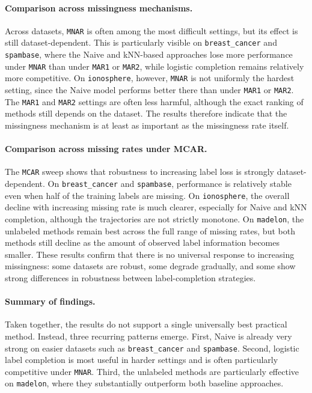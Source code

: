 \documentclass[8pt,a4paper]{extarticle}
\begin{document}
\paragraph{Comparison across missingness mechanisms.}
Across datasets, \texttt{MNAR} is often among the most difficult settings, but its effect is still dataset-dependent. This is particularly visible on \texttt{breast\_cancer} and \texttt{spambase}, where the Naive and kNN-based approaches lose more performance under \texttt{MNAR} than under \texttt{MAR1} or \texttt{MAR2}, while logistic completion remains relatively more competitive. On \texttt{ionosphere}, however, \texttt{MNAR} is not uniformly the hardest setting, since the Naive model performs better there than under \texttt{MAR1} or \texttt{MAR2}. The \texttt{MAR1} and \texttt{MAR2} settings are often less harmful, although the exact ranking of methods still depends on the dataset. The results therefore indicate that the missingness mechanism is at least as important as the missingness rate itself.

\paragraph{Comparison across missing rates under MCAR.}
The \texttt{MCAR} sweep shows that robustness to increasing label loss is strongly dataset-dependent. On \texttt{breast\_cancer} and \texttt{spambase}, performance is relatively stable even when half of the training labels are missing. On \texttt{ionosphere}, the overall decline with increasing missing rate is much clearer, especially for Naive and kNN completion, although the trajectories are not strictly monotone. On \texttt{madelon}, the unlabeled methods remain best across the full range of missing rates, but both methods still decline as the amount of observed label information becomes smaller. These results confirm that there is no universal response to increasing missingness: some datasets are robust, some degrade gradually, and some show strong differences in robustness between label-completion strategies.

\paragraph{Summary of findings.}
Taken together, the results do not support a single universally best practical method. Instead, three recurring patterns emerge. First, Naive is already very strong on easier datasets such as \texttt{breast\_cancer} and \texttt{spambase}. Second, logistic label completion is most useful in harder settings and is often particularly competitive under \texttt{MNAR}. Third, the unlabeled methods are particularly effective on \texttt{madelon}, where they substantially outperform both baseline approaches.
\end{document}
